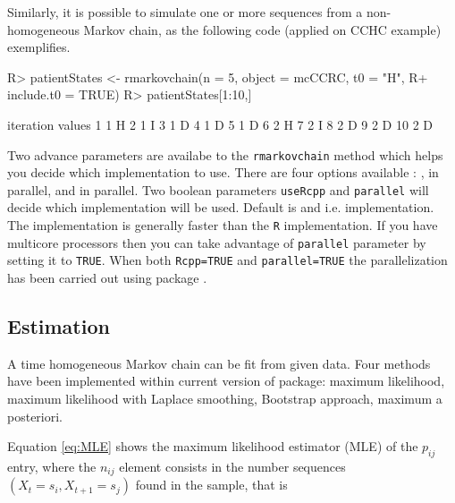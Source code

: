 \documentclass[
  nojss]{jss}
\begin{document}
Similarly, it is possible to simulate one or more sequences from a non-homogeneous Markov chain,
as the following code (applied on CCHC example) exemplifies.

\begin{CodeChunk}

\begin{CodeInput}
R> patientStates <- rmarkovchain(n = 5, object = mcCCRC, t0 = "H", 
R+                               include.t0 = TRUE)
R> patientStates[1:10,]
\end{CodeInput}

\begin{CodeOutput}
   iteration values
1          1      H
2          1      I
3          1      D
4          1      D
5          1      D
6          2      H
7          2      I
8          2      D
9          2      D
10         2      D
\end{CodeOutput}
\end{CodeChunk}

Two advance parameters are availabe to the \texttt{rmarkovchain} method which helps you decide which implementation to use. There are four options available : ,  in parallel,  and  in parallel. Two boolean parameters \texttt{useRcpp} and \texttt{parallel} will decide which implementation will be used. Default is  and  i.e.  implementation. The  implementation is generally faster than the \texttt{R} implementation. If you have multicore processors then you can take advantage of \texttt{parallel} parameter by setting it to \texttt{TRUE}. When both \texttt{Rcpp=TRUE} and \texttt{parallel=TRUE} the parallelization has been carried out using  package \citep{pkg:RcppParallel}.

\hypertarget{estimation}{%
\subsection{Estimation}\label{estimation}}

A time homogeneous Markov chain can be fit from given data. Four methods have been implemented within current version of  package: maximum likelihood, maximum likelihood with Laplace smoothing, Bootstrap approach, maximum a posteriori.

Equation \ref{eq:MLE} shows the maximum likelihood estimator (MLE) of the \(p_{ij}\) entry, where the \(n_{ij}\) element consists in the number sequences \(\left( X_{t}=s_{i}, X_{t+1}=s_{j}\right)\) found in the sample, that is
\end{document}
